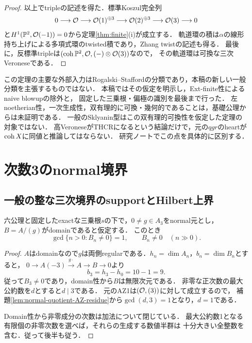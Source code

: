 \documentclass[11pt,a4paper]{ltjsarticle}
\begin{document}
\begin{proof}
以上でtripleの記述を得た．標準Koszul完全列
\[
 0\longrightarrow\mathcal O\longrightarrow\mathcal O(1)^{\oplus3}
 \longrightarrow\mathcal O(2)^{\oplus3}\longrightarrow\mathcal O(3)\longrightarrow0
\]
と$H^1(\mathbb P^2,\mathcal O(-1))=0$から定理\ref{thm:finite}(i)が成立する．
軌道環の積は$\alpha$の線形持ち上げによる多項式環のtwisted積であり，Zhang twistの記述も得る．
最後に，反標準tripleは$(\operatorname{coh}\mathbb P^2,\mathcal O,(-)\otimes\mathcal O(3))$なので，
その軌道環は可換な三次Veroneseである．
\end{proof}

\begin{remark}[分類の適用範囲]\label{rem:birational-scope}
この定理の主要な外部入力はRogalski--Staffordの分類であり，本稿の新しい一般分類を主張するものではない．
本稿ではその仮定を明示し，Ext-finite性によるnaive blowupの除外と，
固定した三乗根・偏極の識別を最後まで行った．
左noetherian性，一次生成性，双有理的に可換・幾何的であることは，基礎公理からは未証明である．
一般のSklyanin型はこの双有理的可換性を仮定した定理の対象ではない．
高VeroneseがTHCRになるという結論だけで，元の$qgr$のheartが$\operatorname{coh} X$に同値と推論してはならない．
研究ノートでこの点を具体的に区別する．
\end{remark}

\section{次数3のnormal境界}\label{sec:elliptic}

\subsection{一般の整な三次境界のsupportとHilbert上界}

\begin{corollary}[三次の整なnormal切断の稠密support]\label{cor:cubic-normal-dense-support}
六公理と固定したexactな三乗根$s$の下で，$0\ne g\in A_3$をnormal元とし，
$B=A/(g)$がdomainであると仮定する．
このとき
\[
 \gcd\{n>0:B_n\ne0\}=1,
 \qquad B_n\ne0\quad(n\gg0).
\]
\end{corollary}
\begin{proof}
$A$はdomainなので$g$は両側regularである．$h_n=\dim A_n$，$b_n=\dim B_n$とすると，
$0\to A(-3)\xrightarrow{g\cdot}A\to B\to0$より
\[
 b_3=h_3-h_0=10-1=9.
\]
従って$B_3\ne0$であり，domain性から$B$は無限次元である．
非零な正次数の最大公約数を$d$とすると$d\mid3$である．
元のAZ1は$(\mathcal O,(3))$に対して成立するので，
補題\ref{lem:normal-quotient-AZ-residue}から$\gcd(d,3)=1$となり，$d=1$である．

Domain性から非零成分の次数は加法について閉じている．
最大公約数1となる有限個の非零次数を選べば，それらの生成する数値半群は
十分大きい全整数を含む．従って後半も従う．
\end{proof}
\end{document}
